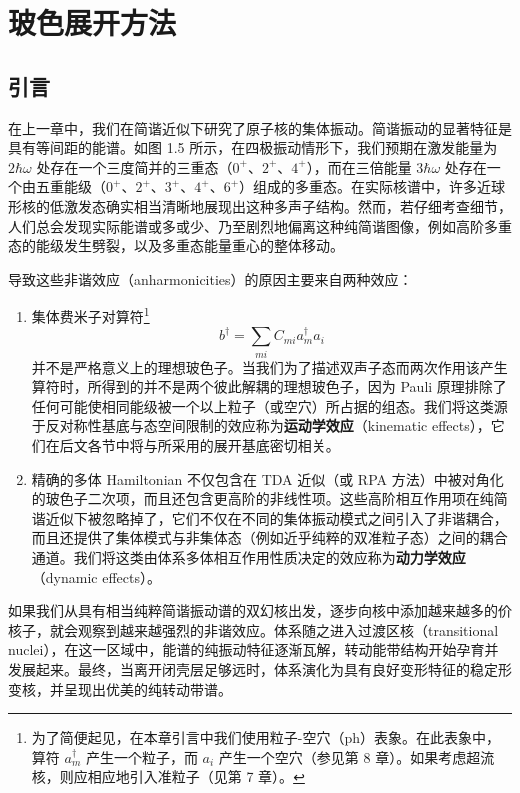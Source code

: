 
\chapter{玻色展开方法\label{chap:=0073BB=008272=005C55=005F00=0065B9=006CD5}}

\section{引言\label{sec:9.1_=005F15=008A00}}

在上一章中，我们在简谐近似下研究了原子核的集体振动。简谐振动的显著特征是具有等间距的能谱。如图 1.5 所示，在四极振动情形下，我们预期在激发能量为
$2\hbar\omega$ 处存在一个三度简并的三重态（$0^{+}$、$2^{+}$、$4^{+}$），而在三倍能量 $3\hbar\omega$
处存在一个由五重能级（$0^{+}$、$2^{+}$、$3^{+}$、$4^{+}$、$6^{+}$）组成的多重态。在实际核谱中，许多近球形核的低激发态确实相当清晰地展现出这种多声子结构。然而，若仔细考查细节，人们总会发现实际能谱或多或少、乃至剧烈地偏离这种纯简谐图像，例如高阶多重态的能级发生劈裂，以及多重态能量重心的整体移动。

导致这些非谐效应（anharmonicities）的原因主要来自两种效应：
\begin{enumerate}
\item 集体费米子对算符\footnote{为了简便起见，在本章引言中我们使用粒子-空穴（ph）表象。在此表象中，算符 $a^{\dagger}_{m}$ 产生一个粒子，而
$a_{i}$ 产生一个空穴（参见第 8 章）。如果考虑超流核，则应相应地引入准粒子（见第 7 章）。}
\begin{equation}
b^{\dagger}=\sum_{mi}C_{mi}a^{\dagger}_{m}a_{i}\label{eq:9.1}
\end{equation}
并不是严格意义上的理想玻色子。当我们为了描述双声子态而两次作用该产生算符时，所得到的并不是两个彼此解耦的理想玻色子，因为 Pauli
原理排除了任何可能使相同能级被一个以上粒子（或空穴）所占据的组态。我们将这类源于反对称性基底与态空间限制的效应称为\textbf{运动学效应}（kinematic
effects），它们在后文各节中将与所采用的展开基底密切相关。
\item 精确的多体 Hamiltonian 不仅包含在 TDA 近似（或 RPA 方法）中被对角化的玻色子二次项，而且还包含更高阶的非线性项。这些高阶相互作用项在纯简谐近似下被忽略掉了，它们不仅在不同的集体振动模式之间引入了非谐耦合，而且还提供了集体模式与非集体态（例如近乎纯粹的双准粒子态）之间的耦合通道。我们将这类由体系多体相互作用性质决定的效应称为\textbf{动力学效应}（dynamic
effects）。
\end{enumerate}
如果我们从具有相当纯粹简谐振动谱的双幻核出发，逐步向核中添加越来越多的价核子，就会观察到越来越强烈的非谐效应。体系随之进入过渡区核（transitional
nuclei），在这一区域中，能谱的纯振动特征逐渐瓦解，转动能带结构开始孕育并发展起来。最终，当离开闭壳层足够远时，体系演化为具有良好变形特征的稳定形变核，并呈现出优美的纯转动带谱。

